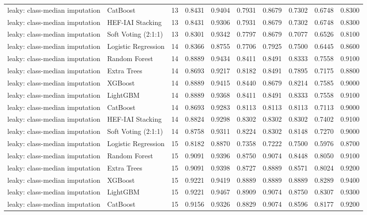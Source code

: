 \begin{tabular}{llrrrrrrrr}
leaky: class-median imputation & CatBoost & 13 & 0.8431 & 0.9404 & 0.7931 & 0.8679 & 0.7302 & 0.6748 & 0.8300 \\
leaky: class-median imputation & HEF-IAI Stacking & 13 & 0.8431 & 0.9306 & 0.7931 & 0.8679 & 0.7302 & 0.6748 & 0.8300 \\
leaky: class-median imputation & Soft Voting (2:1:1) & 13 & 0.8301 & 0.9342 & 0.7797 & 0.8679 & 0.7077 & 0.6526 & 0.8100 \\
leaky: class-median imputation & Logistic Regression & 14 & 0.8366 & 0.8755 & 0.7706 & 0.7925 & 0.7500 & 0.6445 & 0.8600 \\
leaky: class-median imputation & Random Forest & 14 & 0.8889 & 0.9434 & 0.8411 & 0.8491 & 0.8333 & 0.7558 & 0.9100 \\
leaky: class-median imputation & Extra Trees & 14 & 0.8693 & 0.9217 & 0.8182 & 0.8491 & 0.7895 & 0.7175 & 0.8800 \\
leaky: class-median imputation & XGBoost & 14 & 0.8889 & 0.9415 & 0.8440 & 0.8679 & 0.8214 & 0.7585 & 0.9000 \\
leaky: class-median imputation & LightGBM & 14 & 0.8889 & 0.9368 & 0.8411 & 0.8491 & 0.8333 & 0.7558 & 0.9100 \\
leaky: class-median imputation & CatBoost & 14 & 0.8693 & 0.9283 & 0.8113 & 0.8113 & 0.8113 & 0.7113 & 0.9000 \\
leaky: class-median imputation & HEF-IAI Stacking & 14 & 0.8824 & 0.9298 & 0.8302 & 0.8302 & 0.8302 & 0.7402 & 0.9100 \\
leaky: class-median imputation & Soft Voting (2:1:1) & 14 & 0.8758 & 0.9311 & 0.8224 & 0.8302 & 0.8148 & 0.7270 & 0.9000 \\
leaky: class-median imputation & Logistic Regression & 15 & 0.8182 & 0.8870 & 0.7358 & 0.7222 & 0.7500 & 0.5976 & 0.8700 \\
leaky: class-median imputation & Random Forest & 15 & 0.9091 & 0.9396 & 0.8750 & 0.9074 & 0.8448 & 0.8050 & 0.9100 \\
leaky: class-median imputation & Extra Trees & 15 & 0.9091 & 0.9398 & 0.8727 & 0.8889 & 0.8571 & 0.8024 & 0.9200 \\
leaky: class-median imputation & XGBoost & 15 & 0.9221 & 0.9419 & 0.8889 & 0.8889 & 0.8889 & 0.8289 & 0.9400 \\
leaky: class-median imputation & LightGBM & 15 & 0.9221 & 0.9467 & 0.8909 & 0.9074 & 0.8750 & 0.8307 & 0.9300 \\
leaky: class-median imputation & CatBoost & 15 & 0.9156 & 0.9326 & 0.8829 & 0.9074 & 0.8596 & 0.8177 & 0.9200 \\

\end{tabular}
